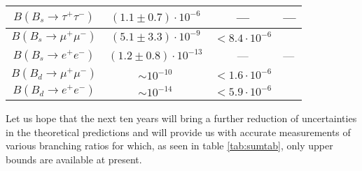 \begin{table}[htb]
\begin{center}
\begin{tabular}{|c|c|c|l|}
\hline
$B(B_s\to\tau^+\tau^-)$ & $(1.1\pm 0.7)\cdot 10^{-6}$
 & --- & ---\\
\hline
$B(B_s\to\mu^+\mu^-)$ & $(5.1\pm 3.3)\cdot 10^{-9}$
 & $<8.4\cdot 10^{-6}$ & \cite{krolletal:95} \\
\hline
$B(B_s\to e^+e^-)$ & $(1.2\pm 0.8)\cdot 10^{-13}$
 & --- & ---\\
\hline
$B(B_d\to\mu^+\mu^-)$ & $\sim 10^{-10}$ & $<1.6\cdot 10^{-6}$ &
\cite{krolletal:95} \\
\hline
$B(B_d\to e^+e^-)$ & $\sim 10^{-14}$ & $<5.9\cdot 10^{-6}$ &
\cite{ammaretal:94} \\
\end{tabular}
\end{center}
\end{table}

Let us hope that the next ten years will bring a further reduction of
uncertainties in the theoretical predictions and will provide us with
accurate measurements of various branching ratios for which, as seen in
table \ref{tab:sumtab}, only  upper bounds are available at present.
